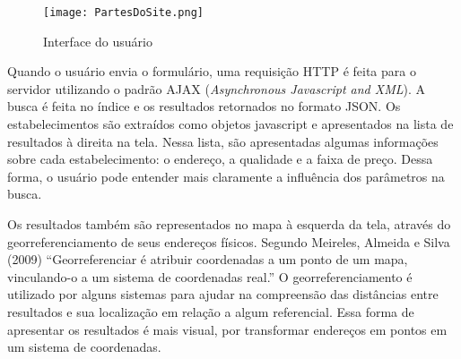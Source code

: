\begin{figure}[!h]
  \centering
  \texttt{[image: PartesDoSite.png]} 
  \caption{Interface do usuário}
  \label{fig:interfusu} 
\end{figure}

Quando o usuário envia o formulário, uma requisição HTTP é feita para o servidor utilizando o padrão AJAX (\emph{Asynchronous Javascript and XML}). A busca é feita no índice e os resultados retornados no formato JSON. Os estabelecimentos são extraídos como objetos javascript e apresentados na lista de resultados à direita na tela. Nessa lista, são apresentadas algumas informações sobre cada estabelecimento: o endereço, a qualidade e a faixa de preço. Dessa forma, o usuário pode entender mais claramente a influência dos parâmetros na busca.

Os resultados também são representados no mapa à esquerda da tela, através do georreferenciamento de seus endereços físicos. Segundo Meireles, Almeida e Silva (2009) ``Georreferenciar é atribuir coordenadas a um ponto de um mapa, vinculando-o a um sistema de coordenadas real.'' O georreferenciamento é utilizado por alguns sistemas para ajudar na compreensão das distâncias entre resultados e sua localização em relação a algum referencial. Essa forma de apresentar os resultados é mais visual, por transformar endereços em pontos em um sistema de coordenadas. 
